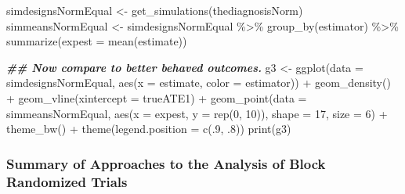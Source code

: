 \documentclass[
  12pt,
]{book}
\newenvironment{Shaded}{\begin{snugshade}}{\end{snugshade}}
\newcommand{\AttributeTok}[1]{\textcolor[rgb]{0.77,0.63,0.00}{#1}}
\newcommand{\DecValTok}[1]{\textcolor[rgb]{0.00,0.00,0.81}{#1}}
\newcommand{\DocumentationTok}[1]{\textcolor[rgb]{0.56,0.35,0.01}{\textbf{\textit{#1}}}}
\newcommand{\FunctionTok}[1]{\textcolor[rgb]{0.00,0.00,0.00}{#1}}
\newcommand{\NormalTok}[1]{#1}
\newcommand{\OtherTok}[1]{\textcolor[rgb]{0.56,0.35,0.01}{#1}}
\newcommand{\SpecialCharTok}[1]{\textcolor[rgb]{0.00,0.00,0.00}{#1}}
\theoremstyle{definition}
\theoremstyle{definition}
\theoremstyle{definition}
\theoremstyle{remark}
\begin{document}
\begin{Shaded}
\begin{Highlighting}[]
\NormalTok{simdesignsNormEqual }\OtherTok{\textless{}{-}} \FunctionTok{get\_simulations}\NormalTok{(thediagnosisNorm)}
\NormalTok{simmeansNormEqual }\OtherTok{\textless{}{-}}\NormalTok{ simdesignsNormEqual }\SpecialCharTok{\%\textgreater{}\%}
  \FunctionTok{group\_by}\NormalTok{(estimator) }\SpecialCharTok{\%\textgreater{}\%}
  \FunctionTok{summarize}\NormalTok{(}\AttributeTok{expest =} \FunctionTok{mean}\NormalTok{(estimate))}
\end{Highlighting}
\end{Shaded}

\begin{Shaded}
\begin{Highlighting}[]
\DocumentationTok{\#\# Now compare to better behaved outcomes.}
\NormalTok{g3 }\OtherTok{\textless{}{-}} \FunctionTok{ggplot}\NormalTok{(}\AttributeTok{data =}\NormalTok{ simdesignsNormEqual, }\FunctionTok{aes}\NormalTok{(}\AttributeTok{x =}\NormalTok{ estimate, }\AttributeTok{color =}\NormalTok{ estimator)) }\SpecialCharTok{+}
  \FunctionTok{geom\_density}\NormalTok{() }\SpecialCharTok{+}
  \FunctionTok{geom\_vline}\NormalTok{(}\AttributeTok{xintercept =}\NormalTok{ trueATE1) }\SpecialCharTok{+}
  \FunctionTok{geom\_point}\NormalTok{(}\AttributeTok{data =}\NormalTok{ simmeansNormEqual, }\FunctionTok{aes}\NormalTok{(}\AttributeTok{x =}\NormalTok{ expest, }\AttributeTok{y =} \FunctionTok{rep}\NormalTok{(}\DecValTok{0}\NormalTok{, }\DecValTok{10}\NormalTok{)), }\AttributeTok{shape =} \DecValTok{17}\NormalTok{, }\AttributeTok{size =} \DecValTok{6}\NormalTok{) }\SpecialCharTok{+}
  \FunctionTok{theme\_bw}\NormalTok{() }\SpecialCharTok{+}
  \FunctionTok{theme}\NormalTok{(}\AttributeTok{legend.position =} \FunctionTok{c}\NormalTok{(.}\DecValTok{9}\NormalTok{, .}\DecValTok{8}\NormalTok{))}
\FunctionTok{print}\NormalTok{(g3)}
\end{Highlighting}
\end{Shaded}

\hypertarget{summary-of-approaches-to-the-analysis-of-block-randomized-trials}{%
\subsubsection{Summary of Approaches to the Analysis of Block Randomized
Trials}\label{summary-of-approaches-to-the-analysis-of-block-randomized-trials}}
\end{document}
